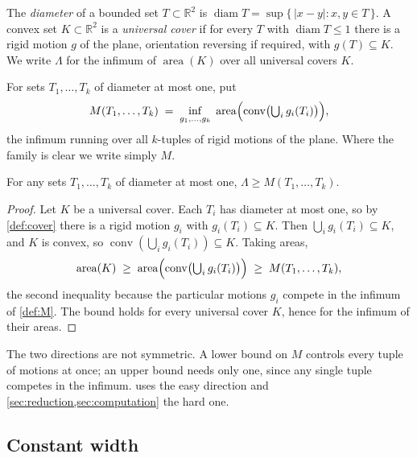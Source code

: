 \documentclass[a4paper,UKenglish,cleveref,autoref,thm-restate,numberwithinsect]{lipics-v2021}
\begin{document}
\begin{definition}
\label{def:cover}
The \emph{diameter} of a bounded set $T\subset\mathbb{R}^2$ is
$\operatorname{diam} T=\sup\{\,|x-y| : x,y\in T\,\}$. A convex set
$K\subset\mathbb{R}^2$ is a \emph{universal cover} if for every $T$ with
$\operatorname{diam} T\le 1$ there is a rigid motion $g$ of the plane, orientation
reversing if required, with $g(T)\subseteq K$. We write $\Lambda$ for the infimum
of $\operatorname{area}(K)$ over all universal covers $K$.
\end{definition}

\begin{definition}
\label{def:M}
For sets $T_1,\dots,T_k$ of diameter at most one, put
\[
  M(T_1,\dots,T_k)
  \;=\;
  \inf_{g_1,\dots,g_k}\;
  \operatorname{area}\Bigl(\operatorname{conv}\bigl(\textstyle\bigcup_{i}g_i(T_i)\bigr)\Bigr),
\]
the infimum running over all $k$-tuples of rigid motions of the plane. Where the
family is clear we write simply $M$.
\end{definition}

\begin{lemma}
\label{lem:testset}
For any sets $T_1,\dots,T_k$ of diameter at most one,
$\Lambda \ge M(T_1,\dots,T_k)$.
\end{lemma}

\begin{proof}
Let $K$ be a universal cover. Each $T_i$ has diameter at most one, so by
\cref{def:cover} there is a rigid motion $g_i$ with $g_i(T_i)\subseteq K$. Then
$\bigcup_i g_i(T_i)\subseteq K$, and $K$ is convex, so
$\operatorname{conv}(\bigcup_i g_i(T_i))\subseteq K$. Taking areas,
\[
  \operatorname{area}(K)
  \;\ge\;
  \operatorname{area}\Bigl(\operatorname{conv}\bigl(\textstyle\bigcup_i g_i(T_i)\bigr)\Bigr)
  \;\ge\; M(T_1,\dots,T_k),
\]
the second inequality because the particular motions $g_i$ compete in the
infimum of \cref{def:M}. The bound holds for every universal cover $K$, hence for
the infimum of their areas.
\end{proof}

The two directions are not symmetric. A lower bound on $M$ controls every tuple
of motions at once; an upper bound needs only one, since any single tuple competes
in the infimum.  uses the easy direction and
\cref{sec:reduction,sec:computation} the hard one.

\subsection{Constant width}
\end{document}
